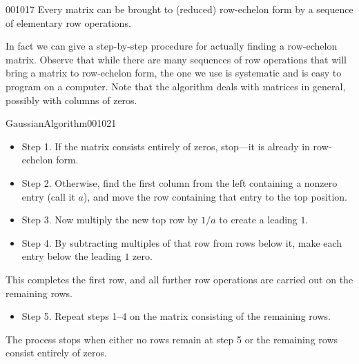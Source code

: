 \begin{theorem}{}{001017}
Every matrix can be brought to (reduced) row-echelon form by a sequence of elementary row operations. 
\end{theorem}

In fact we can give a step-by-step procedure for actually finding a row-echelon matrix. Observe that while there are many sequences of row operations that will bring a matrix to row-echelon form, the one we use is systematic and is easy to program on a computer. Note that the algorithm deals with matrices in general, possibly with columns of zeros. 

\begin{theorem*}{Gaussian\footnotemark Algorithm\footnotemark}{001021}

\begin{itemize}
\item[] Step 1. If the matrix consists entirely of zeros, stop---it is already in row-echelon form.

\item[] Step 2. Otherwise, find the first column from the left containing a nonzero entry (call it $a$), and move the row containing that entry to the top position.
\item[] Step 3. Now multiply the new top row by $1/a$ to create a leading $1$.

\item[] Step 4. By subtracting multiples of that row from rows below it, make each entry below the leading $1$ zero.
\end{itemize}

This completes the first row, and all further row operations are carried out on the remaining rows.

\begin{itemize}
\item[] Step 5. Repeat steps 1--4 on the matrix consisting of the remaining rows.
\end{itemize}
The process stops when either no rows remain at step 5 or the remaining rows consist entirely of zeros. 
\end{theorem*}
